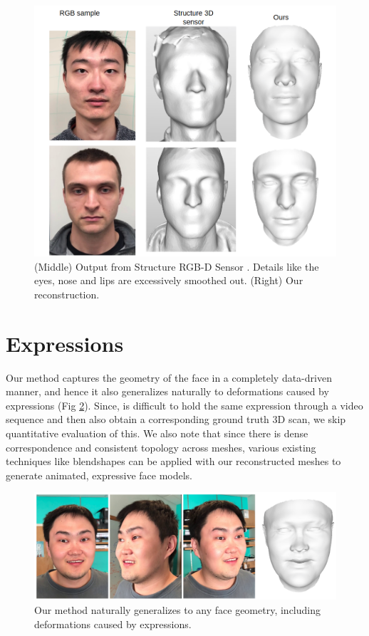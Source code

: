 \begin{figure}
\begin{center}
   \includegraphics[width=0.8\linewidth]{images/struc_3d_comp.png}
\end{center}
   \caption{(Middle) Output from Structure RGB-D Sensor \cite{structure2019}. Details like the eyes, nose and lips are excessively smoothed out. (Right) Our reconstruction.}
\label{fig:long}
\label{fig:onecol}
\end{figure}





\section{Expressions}

Our method captures the geometry of the face in a completely data-driven manner, and hence it also generalizes naturally to deformations caused by expressions (Fig \ref{fig:exp}). Since, is difficult to hold the same expression through a video sequence and then also obtain a corresponding ground truth 3D scan, we skip quantitative evaluation of this. 
We also note that since there is dense correspondence and consistent topology across meshes, various existing techniques like blendshapes \cite{cao2014facewarehouse}  can be applied with our reconstructed meshes to generate animated, expressive face models.


\begin{figure}[t]
\begin{center}
   \includegraphics[width=0.9\linewidth]{images/expressions.png}
\end{center}
   \caption{Our method naturally generalizes to any face geometry, including deformations caused by expressions. }
\label{fig:exp}
\end{figure}